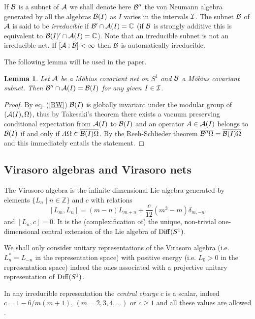 \documentclass[12pt]{article}
\def\Diff{{\rm Diff}}
\def\Om{\Omega}
\newtheorem{lemma}[theorem]{Lemma}
\def\A{{\cal A}}
\def\B{{\cal B}}
\def\I{{\cal I}}
\begin{document}
If $\B$ is a subnet of $\A$ we shall denote here $\B''$ the von Neumann algebra 
generated by all the algebras $\B(I)$ as $I$ varies in the intervals $\I$. 
The subnet $\B$ of $\A$ is said to be {\it irreducible} if 
$\B'\cap\A(I)=\mathbb C$ (if $\B$ is strongly additive this is 
equivalent to $\B(I)'\cap\A(I)=\mathbb C$). Note that an irreducible 
subnet is not an irreducible net. If $[\A:\B]<\infty$ then $\B$ is 
automatically irreducible.

The following lemma will be used in the paper. 
\begin{lemma}\label{subnet}
Let $\A$ be a M\"{o}bius covariant net on $S^1$ and $\B$ a M\"{o}bius covariant 
subnet. Then $\B''\cap\A(I)=\B(I)$ for any given $I\in\I$. 
\end{lemma}
\begin{proof}
By eq. (\ref{BW}) $\B(I)$ is globally 
invariant under the modular group of $(\A(I),\Om)$, thus by Takesaki's theorem 
there exists a vacuum preserving conditional expectation from $\A(I)$ 
to $\B(I)$ and an operator $A\in\A(I)$ belongs to $\B(I)$ if and 
only if $A\Om\in\overline{\B(I)\Om}$. By the Reeh-Schlieder theorem 
$\overline{\B''\Om}=\overline{\B(I)\Om}$ and this immediately entails 
the statement.
\end{proof}

\subsection{Virasoro algebras and Virasoro nets}
\label{Vir-alg-net}

The Virasoro algebra is the infinite dimensional Lie algebra generated 
by elements $\{L_n \mid n\in\mathbb Z\}$ and $c$ with
relations
\begin{equation}\label{vir-rel}
[L_m,L_n]=(m-n) L_{m+n} + \frac{c}{12}(m^3-m)\delta_{m,-n}.
\end{equation}
and $[L_n,c]=0$. It is the (complexification of) the unique, non-trivial
one-dimensional central extension of the Lie algebra of $\Diff(S^1)$.

We shall only consider unitary 
representations of the Virasoro algebra 
(i.e. $L_n^*=L_{-n}$ in the representation space) with positive energy
 (i.e. $L_{0}>0$ in the representation space)
indeed the ones associated with a projective unitary representation of $\Diff(S^1)$.

In any irreducible representation the {\it central charge} $c$ is 
a scalar, indeed $c=1-6/m(m+1)$, $(m=2,3,4,\dots)$ or $c\geq 1$
\cite{FQS} and all these values are allowed \cite{GKO}.
\end{document}
